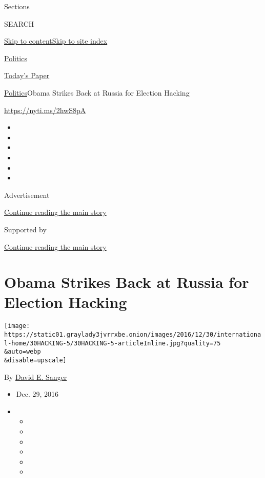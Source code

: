 Sections

SEARCH

\protect\hyperlink{site-content}{Skip to
content}\protect\hyperlink{site-index}{Skip to site index}

\href{https://www.nytimes3xbfgragh.onion/section/politics}{Politics}

\href{https://myaccount.nytimes3xbfgragh.onion/auth/login?response_type=cookie\&client_id=vi}{}

\href{https://www.nytimes3xbfgragh.onion/section/todayspaper}{Today's
Paper}

\href{/section/politics}{Politics}\textbar{}Obama Strikes Back at Russia
for Election Hacking

\url{https://nyti.ms/2hwS8pA}

\begin{itemize}
\item
\item
\item
\item
\item
\item
\end{itemize}

Advertisement

\protect\hyperlink{after-top}{Continue reading the main story}

Supported by

\protect\hyperlink{after-sponsor}{Continue reading the main story}

\hypertarget{obama-strikes-back-at-russia-for-election-hacking}{%
\section{Obama Strikes Back at Russia for Election
Hacking}\label{obama-strikes-back-at-russia-for-election-hacking}}

\texttt{[image: https://static01.graylady3jvrrxbe.onion/images/2016/12/30/international-home/30HACKING-5/30HACKING-5-articleInline.jpg?quality=75\\\&auto=webp\\\&disable=upscale]}

By \href{http://www.nytimes3xbfgragh.onion/by/david-e-sanger}{David E.
Sanger}

\begin{itemize}
\item
  Dec. 29, 2016
\item
  \begin{itemize}
  \item
  \item
  \item
  \item
  \item
  \item
  \end{itemize}
\end{itemize}

